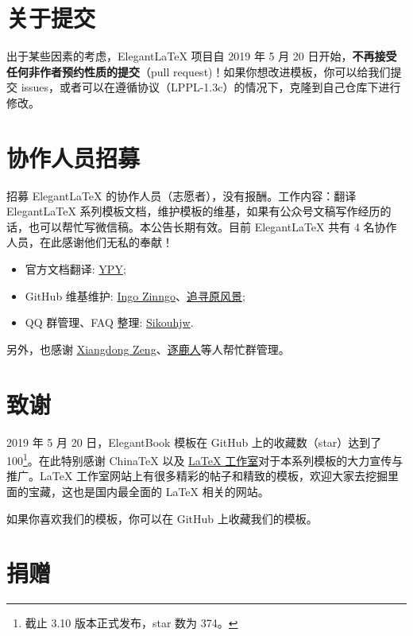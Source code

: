 \documentclass[cn,11pt]{elegantbook}
\begin{document}
\section{关于提交}

出于某些因素的考虑，Elegant\LaTeX{} 项目自 2019 年 5 月 20 日开始，\textbf{不再接受任何非作者预约性质的提交}（pull request)！如果你想改进模板，你可以给我们提交 issues，或者可以在遵循协议（LPPL-1.3c）的情况下，克隆到自己仓库下进行修改。

\section{协作人员招募}

招募 Elegant\LaTeX{} 的协作人员（志愿者），没有报酬。工作内容：翻译 Elegant\LaTeX{} 系列模板文档，维护模板的维基，如果有公众号文稿写作经历的话，也可以帮忙写微信稿。本公告长期有效。目前 Elegant\LaTeX{} 共有 4 名协作人员，在此感谢他们无私的奉献！
\begin{itemize}
  \item 官方文档翻译: \href{https://github.com/peggy2006xzyz}{YPY};
  \item GitHub 维基维护: \href{https://github.com/izinngo}{Ingo Zinngo}、\href{https://github.com/xiaohao890809}{追寻原风景};
  \item QQ 群管理、FAQ 整理: \href{https://github.com/sikouhjw}{Sikouhjw}.
\end{itemize}

另外，也感谢 \href{https://github.com/stone-zeng}{Xiangdong Zeng}、\href{https://github.com/latexers}{逐鹿人}等人帮忙群管理。

\section{致谢}
2019 年 5 月 20 日，ElegantBook 模板在 GitHub 上的收藏数（star）达到了 100\footnote{截止 3.10 版本正式发布，star 数为 374。}。在此特别感谢 China\TeX{} 以及 \href{http://www.latexstudio.net/}{\LaTeX{} 工作室}对于本系列模板的大力宣传与推广。\LaTeX{} 工作室网站上有很多精彩的帖子和精致的模板，欢迎大家去挖掘里面的宝藏，这也是国内最全面的 \LaTeX{} 相关的网站。

如果你喜欢我们的模板，你可以在 GitHub 上收藏我们的模板。

\section{捐赠}
\end{document}
